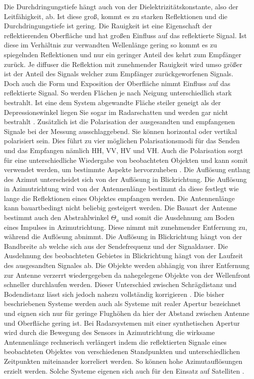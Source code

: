 Die Durchdringungstiefe hängt auch von der Dielektrizitätskonstante, also der Leitfähigkeit, ab. Ist diese groß, kommt es zu starken Reflektionen und die 
Durchdringungstiefe ist gering. Die Rauigkeit ist eine Eigenschaft der reflektierenden Oberfläche und hat großen Einfluss auf das reflektierte Signal. Ist diese im Verhältnis
zur verwandten Wellenlänge gering so kommt es zu spiegelnden Reflektionen und nur ein geringer Anteil des kehrt zum Empfänger zurück. Je diffuser
die Reflektion mit zunehmender Rauigkeit wird umso größer ist der Anteil des Signals welcher zum Empfänger zurückgeworfenen Signals. Doch auch die Form und Exposition der Oberfläche 
nimmt Einfluss auf das reflektierte Signal. So werden Flächen je nach Neigung unterschiedlich stark bestrahlt. Ist eine dem System abgewandte Fläche steiler geneigt als der Depressionswinkel 
liegen Sie sogar im Radarschatten und werden gar nicht bestrahlt \cite{einfuehrung_in_fernerkundung}. 
Zusätzlich ist die Polarisation der ausgesandten und empfangenen Signale bei der Messung ausschlaggebend. Sie können horizontal oder 
vertikal polarisiert sein. Dies führt zu vier möglichen Polarisationsmodi für das Senden und das Empfangen nämlich HH, VV, HV und VH. Auch die 
Polarisation sorgt für eine unterschiedliche Wiedergabe von beobachteten Objekten und kann somit verwendet werden, um bestimmte Aspekte hervorzuheben
 \cite{einfuehrung_in_fernerkundung}. Die Auflösung entlang des Azimut unterscheidet sich von der Auflösung in Blickrichtung. Die Auflösung in Azimutrichtung wird von 
der Antennenlänge bestimmt da diese festlegt wie lange die Reflektionen eines Objektes empfangen werden. Die Antennenlänge kann bauartbedingt nicht beliebig gesteigert werden.
Die Bauart der Antenne bestimmt auch den Abstrahlwinkel $\Theta_a$ und somit die Ausdehnung am Boden eines Impulses in Azimutrichtung. Diese nimmt mit zunehmender Entfernung
zu, während die Auflösung abnimmt.
Die Auflösung in Blickrichtung hängt von der Bandbreite ab welche sich aus der Sendefrequenz und der Signaldauer. Die Ausdehnung des beobachteten Gebietes 
in Blickrichtung hängt von der Laufzeit des ausgesandten Signales ab. Die Objekte werden abhängig von ihrer Entfernung zur Antenne verzerrt wiedergegeben da nahegelegene 
Objekte von der Wellenfront schneller durchlaufen werden. Dieser Unterschied zwischen Schrägdistanz und Bodendistanz lässt sich jedoch nahezu vollständig korrigieren 
\cite{einfuehrung_in_fernerkundung}. Die bisher beschriebenen Systeme werden auch als Systeme mit realer Apertur bezeichnet und eignen sich nur für geringe Flughöhen da hier 
der Abstand zwischen Antenne und Oberfläche gering ist. Bei Radarsystemen mit einer synthetischen Apertur wird durch die Bewegung des Sensors in Azimutrichtung die 
wirksame Antennenlänge rechnerisch verlängert indem die reflektierten Signale eines beobachteten Objektes von verschiedenen Standpunkten und unterschiedlichen Zeitpunkten 
miteinander korreliert werden. So können hohe Azimutauflösungen erzielt werden. Solche Systeme eigenen sich auch für den Einsatz auf Satelliten \cite{einfuehrung_in_fernerkundung}. 

